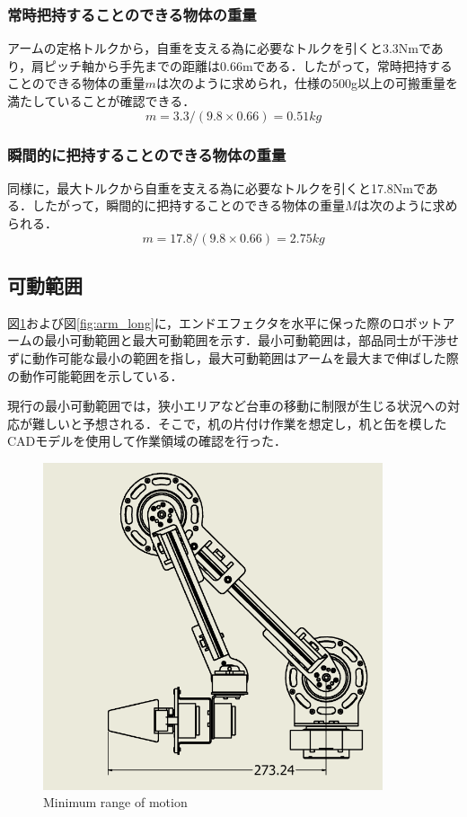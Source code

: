 \subsubsection{常時把持することのできる物体の重量}
アームの定格トルクから，自重を支える為に必要なトルクを引くと3.3Nmであり，肩ピッチ軸から手先までの距離は0.66mである．したがって，常時把持することのできる物体の重量$m$は次のように求められ，仕様の500g以上の可搬重量を満たしていることが確認できる．
\begin{equation}
  m = 3.3 / (9.8 \times 0.66) = 0.51kg
\end{equation}

\subsubsection{瞬間的に把持することのできる物体の重量}
同様に，最大トルクから自重を支える為に必要なトルクを引くと17.8Nmである．したがって，瞬間的に把持することのできる物体の重量$M$は次のように求められる．
\begin{equation}
  m = 17.8 / (9.8 \times 0.66) = 2.75kg
\end{equation}

\subsection{可動範囲}
図\ref{fig:arm_short}および図\ref{fig:arm_long}に，エンドエフェクタを水平に保った際のロボットアームの最小可動範囲と最大可動範囲を示す．最小可動範囲は，部品同士が干渉せずに動作可能な最小の範囲を指し，最大可動範囲はアームを最大まで伸ばした際の動作可能範囲を示している．

現行の最小可動範囲では，狭小エリアなど台車の移動に制限が生じる状況への対応が難しいと予想される．そこで，机の片付け作業を想定し，机と缶を模したCADモデルを使用して作業領域の確認を行った．
\begin{figure}[h]
  \centering
  \includegraphics[width=10cm]{images/design/arm_short.png}
  \caption{Minimum range of motion}
  \label{fig:arm_short}
\end{figure}

